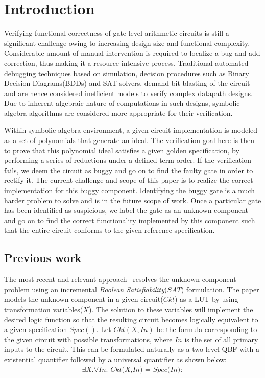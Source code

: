 \section{Introduction}
Verifying functional correctness of gate level arithmetic circuits is still a significant challenge owing to increasing design size and functional complexity. Considerable amount of manual intervention is required to localize a bug and add correction, thus making it a resource intensive process. Traditional automated debugging techniques based on simulation, decision procedures such as Binary Decision Diagrams(BDDs)\cite{bryant:1} and SAT solvers\cite{alanmi:2006}, demand bit-blasting of the circuit and are hence considered inefficient models to verify complex datapath designs. Due to inherent algebraic nature of computations in such designs, symbolic algebra algorithms are considered more appropriate for their verification.

Within symbolic algebra environment, a given circuit implementation is modeled as a set of polynomials that generate an ideal. The verification goal here is then to prove that this polynomial ideal satisfies a given golden specification, by performing a series of reductions under a defined term order. If the verification fails, we deem the circuit as buggy and go on to find the faulty gate in order to rectify it. The current challenge and scope of this paper is to realize the correct implementation for this buggy component. Identifying the buggy gate is a much harder problem to solve and is in the future scope of work. Once a particular gate has been identified as suspicious, we label the gate as an unknown component and go on to find the correct functionality implemented by this component such that the entire circuit conforms to the given reference specification.
\vspace{-0.1in}
\subsection{Previous work}

The most recent and relevant approach~\cite{fujita:2015}\cite{fujita:2012} resolves the unknown component problem using an incremental \textit{Boolean Satisfiability}($SAT$) formulation. The paper models the unknown component in a given circuit($Ckt$) as a LUT by using transformation variables($X$). The solution to these variables will implement the desired logic function so that the resulting circuit becomes logically equivalent to a given specification $Spec()$. Let $Ckt(X,In)$ be the formula corresponding to the given circuit with possible transformations, where $In$ is the set of all primary inputs to the circuit. This can be formulated naturally as a two-level QBF with a existential quantifier followed by a universal quantifier as shown below:
\vspace{0.1in}
\begin{align}
\exists \textit{X}.\forall \textit{In. Ckt(X,In) = Spec(In)}:    
\end{align}

